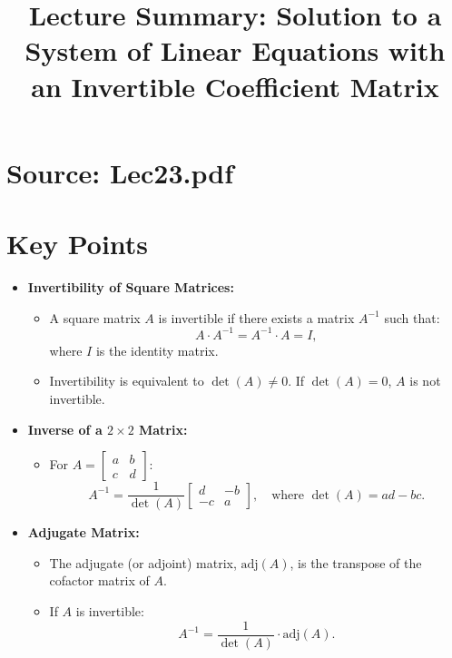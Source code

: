 \documentclass{article}
\title{Lecture Summary: Solution to a System of Linear Equations with an Invertible Coefficient Matrix}
\author{}
\date{}
\begin{document}
\maketitle

\section*{Source: Lec23.pdf}

\section*{Key Points}

\begin{itemize}
  \item \textbf{Invertibility of Square Matrices:}
    \begin{itemize}
      \item A square matrix $A$ is invertible if there exists a matrix $A^{-1}$ such that:
        \[
          A \cdot A^{-1} = A^{-1} \cdot A = I,
        \]
        where $I$ is the identity matrix.
      \item Invertibility is equivalent to $\det(A) \neq 0$. If $\det(A) = 0$, $A$ is not invertible.
    \end{itemize}

  \item \textbf{Inverse of a $2 \times 2$ Matrix:}
    \begin{itemize}
      \item For $A =
        \begin{bmatrix}
          a & b \\
          c & d
        \end{bmatrix}$:
        \[
          A^{-1} = \frac{1}{\det(A)}
          \begin{bmatrix}
            d & -b \\
            -c & a
          \end{bmatrix}, \quad \text{where } \det(A) = ad - bc.
        \]
    \end{itemize}

  \item \textbf{Adjugate Matrix:}
    \begin{itemize}
      \item The adjugate (or adjoint) matrix, $\text{adj}(A)$, is the transpose of the cofactor matrix of $A$.
      \item If $A$ is invertible:
        \[
          A^{-1} = \frac{1}{\det(A)} \cdot \text{adj}(A).
        \]
    \end{itemize}


\end{itemize}
\end{document}

